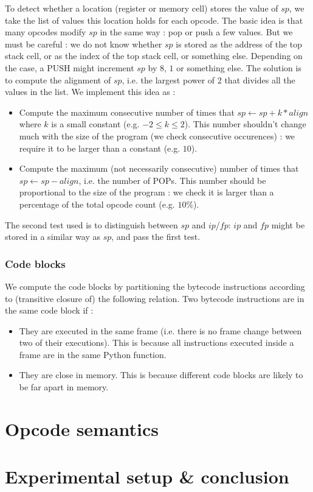 \documentclass[french]{article}
\begin{document}
To detect whether a location (register or memory cell) stores the value of $sp$, we take the list of values this location holds for each opcode. The basic idea is that many opcodes modify $sp$ in the same way : pop or push a few values. But we must be careful : we do not know whether $sp$ is stored as the address of the top stack cell, or as the index of the top stack cell, or something else. Depending on the case, a PUSH might increment $sp$ by $8$, $1$ or something else. The solution is to compute the alignment of $sp$, i.e. the largest power of $2$ that divides all the values in the list. We implement this idea as :
\begin{itemize}
	\item Compute the maximum consecutive number of times that $sp \leftarrow sp + k*align$ where $k$ is a small constant (e.g. $-2 \leq k \leq 2$). This number shouldn't change much with the size of the program (we check consecutive occurences) : we require it to be larger than a constant (e.g. $10$).
	\item Compute the maximum (not necessarily consecutive) number of times that $sp \leftarrow sp - align$, i.e. the number of POPs. This number should be proportional to the size of the program : we check it is larger than a percentage of the total opcode count (e.g. $10\%$).
\end{itemize}
The second test used is to distinguish between $sp$ and $ip$/$fp$: $ip$ and $fp$ might be stored in a similar way as $sp$, and pass the first test. 

\subsubsection{Code blocks}

We compute the code blocks by partitioning the bytecode instructions according to (transitive closure of) the following relation. Two bytecode instructions are in the same code block if :
\begin{itemize}
	\item They are executed in the same frame (i.e. there is no frame change between two of their executions). This is because all instructions executed inside a frame are in the same Python function.
	\item They are close in memory. This is because different code blocks are likely to be far apart in memory. %
\end{itemize}


\section{Opcode semantics}


\section{Experimental setup \& conclusion}
\end{document}
